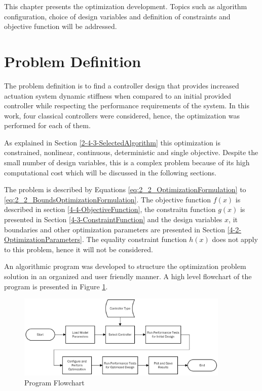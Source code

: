 
This chapter presents the optimization development. Topics such as algorithm configuration, choice of design variables and definition of constraints and objective function will be addressed.

\section{Problem Definition}

The problem definition is to find a controller design that provides increased actuation system dynamic stiffness when compared to an initial provided controller while respecting the performance requirements of the system. In this work, four classical controllers were considered, hence, the optimization was performed for each of them.

As explained in Section \ref{2-4-3-SelectedAlgorithm} this optimization is constrained, nonlinear, continuous, deterministic and single objective. Despite the small number of design variables, this is a complex problem because of its high computational cost which will be discussed in the following sections.

The problem is described by Equations \ref{eq:2_2_OptimizationFormulation} to \ref{eq:2_2_BoundsOptimizationFormulation}. The objective function $f(x)$ is described in section \ref{4-4-ObjectiveFunction}, the constraitn function $g(x)$ is presented in Section \ref{4-3-ConstraintFunction} and the design variables $x$, it boundaries and other optimization parameters are presented in Section \ref{4-2-OptimizationParameters}. The equality constraint function $h(x)$ does not apply to this problem, hence it will not be considered. 

An algorithmic program was developed to structure the optimization problem solution in an organized and user friendly manner. A high level flowchart of the program is presented in Figure \ref{fig:4_1_MainFlowchart}.

\begin{figure}[H]
	\centering
	\centerline{\includegraphics[width=0.9\textwidth]{Figuras/4.DynamicStifinessOptimizationAlgorithm/4-1-MainFlowchart.jpg}}
	\caption{Program Flowchart}
	\label{fig:4_1_MainFlowchart}
\end{figure}

